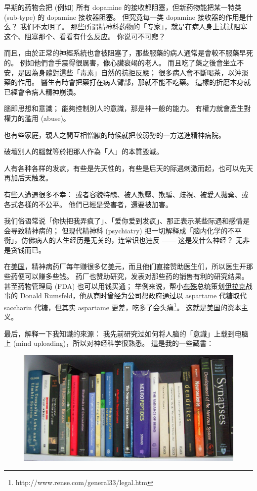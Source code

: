\documentclass[12pt]{report}
\begin{document}
{早期的药物会把 (例如) 所有 dopamine 的接收都阻塞，但新药物能把某一特类 (sub-type) 的 dopamine 接收器阻塞。 但究竟每一类 dopamine 接收器的作用是什么？ 我们不太明了。 那些所谓精神科药物的「专家」，就是在病人身上试试阻塞这个、阻塞那个、看看有什么反应。 你说可不可悲？

而且，由於正常的神經系統也會被阻塞了，那些服藥的病人通常是會較不服藥早死的。 例如他們會手震得很厲害，像心臟衰竭的老人。 而且吃了藥之後會坐立不安，是因為身體對這些「毒素」自然的抗拒反應； 很多病人會不斷喝茶，以沖淡藥的作用。 醫生有時會把藥打在病人臂部，那就不能不吃藥。 這樣的折磨本身就已經會令病人精神崩潰。

腦即思想和意識； 能夠控制別人的意識，那是神一般的能力。 有權力就會產生對權力的濫用 (abuse)。

也有些家庭，親人之間互相憎厭的時候就把較弱勢的一方送進精神病院。

破壞別人的腦就等於把那人作為「人」的本質毀滅。

人有各种各样的发疯，有些是先天性的，有些是后天的际遇刺激而起，也可以先天再加后天触发。

有些人遭遇很多不幸： 或者容貌特醜、被人欺壓、欺騙、歧視、被愛人拋棄、或各式各樣的不公平。 他們已經是受害者，還要被加害。

我们俗语常说「你快把我弄疯了」、「爱你爱到发疯」、那正表示某些际遇和感情是会导致精神病的； 但现代精神科 (psychiatry) 把一切解释成「脑内化学的不平衡」，仿佛病人的人生经历是无关的，连常识也违反 —— 这是发什么神经？ 无非是贪钱而已。

在\uline{美国}，精神病药厂每年赚很多亿\uline{美}元，而且他们直接赞助医生们，所以医生开那些药便可以赚多些钱。 药厂也赞助研究，发表对那些药的销售有利的研究结果。 甚至药物管理局 (FDA) 也可以用钱买通； 举例来说，帮小\uline{布殊}总统策划\uline{伊拉克}战事的 Donald Rumsfeld，他从商时曾经为公司帮政府通过以 aspartame 代糖取代 saccharin 代糖，但其实 aspartame 更差，吃多了会头痛\footnote{http://www.rense.com/general33/legal.htm}。 这就是\uline{美国}的资本主义。

最后，解释一下我知識的來源： 我先前研究过如何将人脑的「意識」上载到电脑上 (mind uploading)，所以对神经科学很熟悉。 這是我的一些藏書：

\begin{figure}[H]
\centering
\includegraphics[scale=0.5]{neuro-books1.jpg}
\end{figure}

}
\end{document}
